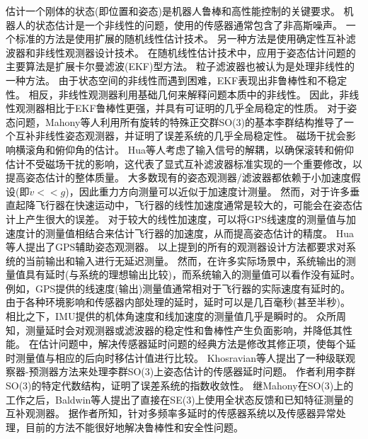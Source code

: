 \documentclass[
  type=master
]{gdutthesis}
\begin{document}
估计一个刚体的状态(即位置和姿态)是机器人鲁棒和高性能控制的关键要求。
机器人的状态估计是一个非线性的问题，使用的传感器通常包含了非高斯噪声\cite{baldwin2009inertial}。
一个标准的方法是使用扩展的随机线性估计技术\cite{lefferts1982kalman,barshan1995inertial}。
另一种方法是使用确定性互补滤波器和非线性观测器设计技术\cite{zimmermann1992high,baerveldt1997low,vik2001nonlinear}。
在随机线性估计技术中，应用于姿态估计问题的主要算法是扩展卡尔曼滤波(EKF)型方法。
粒子滤波器也被认为是处理非线性的一种方法\cite{cheng2004particle}。
由于状态空间的非线性而遇到困难，EKF表现出非鲁棒性和不稳定性\cite{crassidis2007survey}。
相反，非线性观测器利用基础几何来解释问题本质中的非线性。
因此，非线性观测器相比于EKF鲁棒性更强，并具有可证明的几乎全局稳定的性质\cite{thienel2003coupled,mahony2008nonlinear,lageman2009gradient,hua2010attitude,vasconcelos2010nonlinear}。
对于姿态问题，Mahony等人利用所有旋转的特殊正交群SO(3)的基本李群结构推导了一个互补非线性姿态观测器，并证明了误差系统的几乎全局稳定性\cite{mahony2008nonlinear}。
磁场干扰会影响横滚角和俯仰角的估计。
Hua等人考虑了输入信号的解耦，以确保滚转和俯仰估计不受磁场干扰的影响，这代表了显式互补滤波器标准实现的一个重要修改，以提高姿态估计的整体质量\cite{hua2011nonlinear}。
大多数现有的姿态观测器/滤波器都依赖于小加速度假设(即$\dot{v}<<g$)，因此重力方向测量可以近似于加速度计测量。
然而，对于许多垂直起降飞行器在快速运动中，飞行器的线性加速度通常是较大的，可能会在姿态估计上产生很大的误差。
对于较大的线性加速度，可以将GPS线速度的测量值与加速度计的测量值相结合来估计飞行器的加速度，从而提高姿态估计的精度。
Hua等人提出了GPS辅助姿态观测器\cite{hua2010attitude}。
以上提到的所有的观测器设计方法都要求对系统的当前输出和输入进行无延迟测量。
然而，在许多实际场景中，系统输出的测量值具有延时(与系统的理想输出比较)，而系统输入的测量值可以看作没有延时。
例如，GPS提供的线速度(输出)测量值通常相对于飞行器的实际速度有延时的。
由于各种环境影响和传感器内部处理的延时，延时可以是几百毫秒(甚至半秒)\cite{kingston2004real}。
相比之下，IMU提供的机体角速度和线加速度的测量值几乎是瞬时的。
众所周知，测量延时会对观测器或滤波器的稳定性和鲁棒性产生负面影响，并降低其性能\cite{battilotti2015nonlinear}。
在估计问题中，解决传感器延时问题的经典方法是修改其修正项，使每个延时测量值与相应的后向时移估计值进行比较。
Khosravian等人提出了一种级联观察器-预测器方法来处理李群SO(3)上姿态估计的传感器延时问题\cite{khosravian2016state}。
作者利用李群SO(3)的特定代数结构，证明了误差系统的指数收敛性。
继Mahony在SO(3)上的工作之后，Baldwin等人提出了直接在SE(3)上使用全状态反馈和已知特征测量的互补观测器\cite{baldwin2007complementary}。
据作者所知，针对多频率多延时的传感器系统以及传感器异常处理，目前的方法不能很好地解决鲁棒性和安全性问题。
\end{document}
